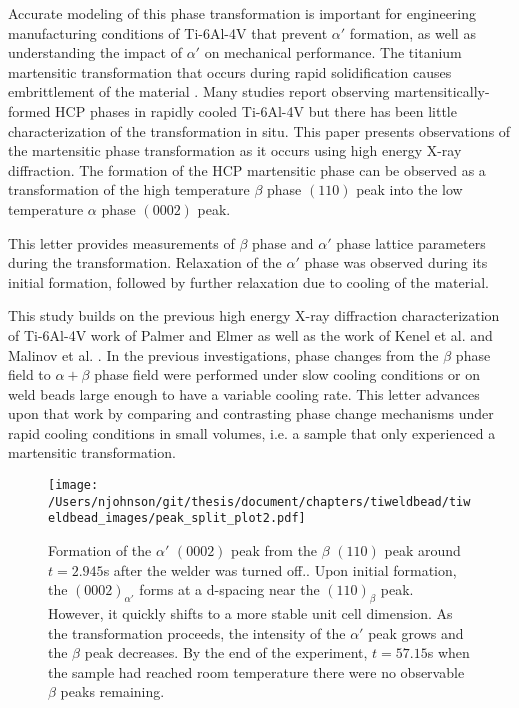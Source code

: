 Accurate modeling of this phase transformation is important for engineering manufacturing conditions of Ti-6Al-4V that prevent $\alpha'$ formation, as well as understanding the impact of $\alpha'$ on mechanical performance. The titanium martensitic transformation that occurs during rapid solidification causes embrittlement of the material \cite{Xu2015}. Many studies report observing martensitically-formed HCP phases in rapidly cooled Ti-6Al-4V but there has been little characterization of the transformation in situ. This paper presents observations of the martensitic phase transformation as it occurs using high energy X-ray diffraction. The formation of the HCP martensitic phase can be observed as a transformation of the high temperature $\beta$ phase $(110)$ peak into the low temperature $\alpha$ phase $(0002)$ peak. 

This letter provides measurements of $\beta$ phase and $\alpha'$ phase lattice parameters during the transformation. Relaxation of the $\alpha'$ phase was observed during its initial formation, followed by further relaxation due to cooling of the material.

This study builds on the previous high energy X-ray diffraction characterization of Ti-6Al-4V work of Palmer and Elmer \cite{Elmer2003, Elmer2004, Elmer2005} as well as the work of Kenel et al. \cite{Kenel2017} and Malinov et al. \cite{Malinov2002}. In the previous investigations, phase changes from the $\beta$ phase field to $\alpha + \beta$ phase field were performed under slow cooling conditions or on weld beads large enough to have a variable cooling rate. This letter advances upon that work by comparing and contrasting phase change mechanisms under rapid cooling conditions in small volumes, i.e. a sample that only experienced a martensitic transformation.

\begin{figure*}
    \centering
    \texttt{[image: /Users/njohnson/git/thesis/document/chapters/tiweldbead/tiweldbead\_images/peak\_split\_plot2.pdf]}
    \caption{Formation of the $\alpha'$ $(0002)$ peak from the $\beta$ $(110)$ peak around $t = 2.945$s after the welder was turned off.. Upon initial formation, the $(0002)_{\alpha'}$ forms at a d-spacing near the $(110)_\beta$ peak. However, it quickly shifts to a more stable unit cell dimension. As the transformation proceeds, the intensity of the $\alpha'$ peak grows and the $\beta$ peak decreases. By the end of the experiment, $t=57.15$s when the sample had reached room temperature there were no observable $\beta$ peaks remaining.
    }
    \label{peaksplit}
\end{figure*}

